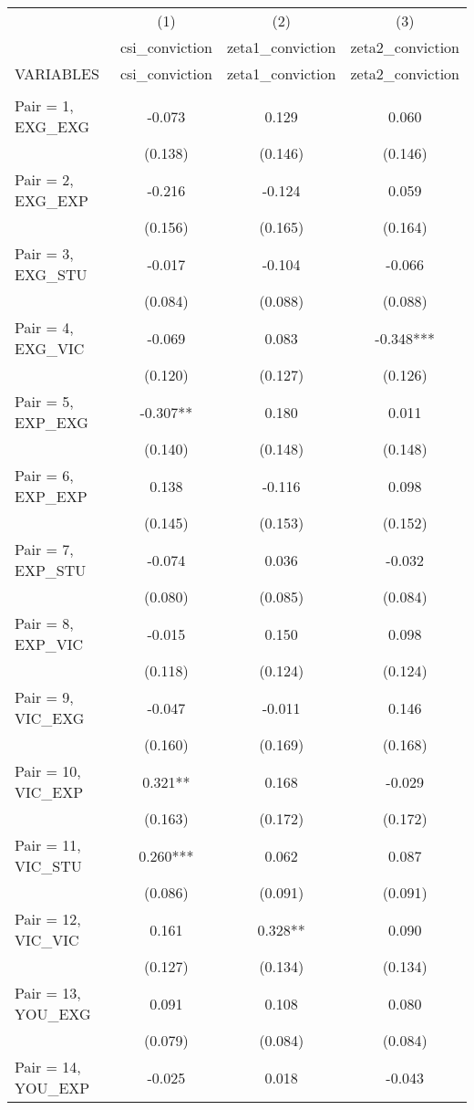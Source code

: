 \documentclass[]{article}
\begin{document}
\begin{tabular}{lccc} \hline
 & (1) & (2) & (3) \\
 & csi\_conviction & zeta1\_conviction & zeta2\_conviction \\
VARIABLES & csi\_conviction & zeta1\_conviction & zeta2\_conviction \\ \hline
 &  &  &  \\
Pair = 1, EXG\_EXG & -0.073 & 0.129 & 0.060 \\
 & (0.138) & (0.146) & (0.146) \\
Pair = 2, EXG\_EXP & -0.216 & -0.124 & 0.059 \\
 & (0.156) & (0.165) & (0.164) \\
Pair = 3, EXG\_STU & -0.017 & -0.104 & -0.066 \\
 & (0.084) & (0.088) & (0.088) \\
Pair = 4, EXG\_VIC & -0.069 & 0.083 & -0.348*** \\
 & (0.120) & (0.127) & (0.126) \\
Pair = 5, EXP\_EXG & -0.307** & 0.180 & 0.011 \\
 & (0.140) & (0.148) & (0.148) \\
Pair = 6, EXP\_EXP & 0.138 & -0.116 & 0.098 \\
 & (0.145) & (0.153) & (0.152) \\
Pair = 7, EXP\_STU & -0.074 & 0.036 & -0.032 \\
 & (0.080) & (0.085) & (0.084) \\
Pair = 8, EXP\_VIC & -0.015 & 0.150 & 0.098 \\
 & (0.118) & (0.124) & (0.124) \\
Pair = 9, VIC\_EXG & -0.047 & -0.011 & 0.146 \\
 & (0.160) & (0.169) & (0.168) \\
Pair = 10, VIC\_EXP & 0.321** & 0.168 & -0.029 \\
 & (0.163) & (0.172) & (0.172) \\
Pair = 11, VIC\_STU & 0.260*** & 0.062 & 0.087 \\
 & (0.086) & (0.091) & (0.091) \\
Pair = 12, VIC\_VIC & 0.161 & 0.328** & 0.090 \\
 & (0.127) & (0.134) & (0.134) \\
Pair = 13, YOU\_EXG & 0.091 & 0.108 & 0.080 \\
 & (0.079) & (0.084) & (0.084) \\
Pair = 14, YOU\_EXP & -0.025 & 0.018 & -0.043 \\

\end{tabular}
\end{document}
